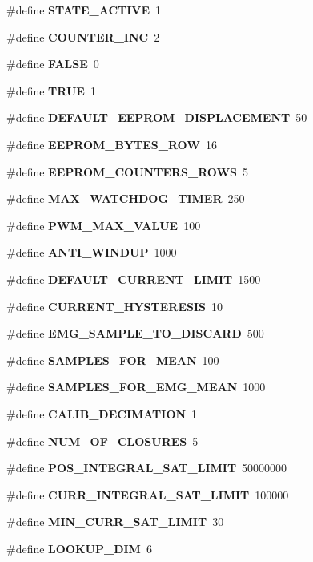 \begin{DoxyCompactItemize}
\item 
\#define \textbf{ S\+T\+A\+T\+E\+\_\+\+A\+C\+T\+I\+VE}~1
\item 
\#define \textbf{ C\+O\+U\+N\+T\+E\+R\+\_\+\+I\+NC}~2
\item 
\mbox{\label{globals_8h_aa93f0eb578d23995850d61f7d61c55c1}} 
\#define {\bfseries F\+A\+L\+SE}~0
\item 
\mbox{\label{globals_8h_aa8cecfc5c5c054d2875c03e77b7be15d}} 
\#define {\bfseries T\+R\+UE}~1
\item 
\#define \textbf{ D\+E\+F\+A\+U\+L\+T\+\_\+\+E\+E\+P\+R\+O\+M\+\_\+\+D\+I\+S\+P\+L\+A\+C\+E\+M\+E\+NT}~50
\item 
\#define \textbf{ E\+E\+P\+R\+O\+M\+\_\+\+B\+Y\+T\+E\+S\+\_\+\+R\+OW}~16
\item 
\#define \textbf{ E\+E\+P\+R\+O\+M\+\_\+\+C\+O\+U\+N\+T\+E\+R\+S\+\_\+\+R\+O\+WS}~5
\item 
\#define \textbf{ M\+A\+X\+\_\+\+W\+A\+T\+C\+H\+D\+O\+G\+\_\+\+T\+I\+M\+ER}~250
\item 
\#define \textbf{ P\+W\+M\+\_\+\+M\+A\+X\+\_\+\+V\+A\+L\+UE}~100
\item 
\#define \textbf{ A\+N\+T\+I\+\_\+\+W\+I\+N\+D\+UP}~1000
\item 
\#define \textbf{ D\+E\+F\+A\+U\+L\+T\+\_\+\+C\+U\+R\+R\+E\+N\+T\+\_\+\+L\+I\+M\+IT}~1500
\item 
\#define \textbf{ C\+U\+R\+R\+E\+N\+T\+\_\+\+H\+Y\+S\+T\+E\+R\+E\+S\+IS}~10
\item 
\#define \textbf{ E\+M\+G\+\_\+\+S\+A\+M\+P\+L\+E\+\_\+\+T\+O\+\_\+\+D\+I\+S\+C\+A\+RD}~500
\item 
\#define \textbf{ S\+A\+M\+P\+L\+E\+S\+\_\+\+F\+O\+R\+\_\+\+M\+E\+AN}~100
\item 
\#define \textbf{ S\+A\+M\+P\+L\+E\+S\+\_\+\+F\+O\+R\+\_\+\+E\+M\+G\+\_\+\+M\+E\+AN}~1000
\item 
\mbox{\label{globals_8h_a373fe6bcff3bcd2f3c47359f9e640bf5}} 
\#define {\bfseries C\+A\+L\+I\+B\+\_\+\+D\+E\+C\+I\+M\+A\+T\+I\+ON}~1
\item 
\mbox{\label{globals_8h_a3132fbe7ff2f1850f96481fca447326a}} 
\#define {\bfseries N\+U\+M\+\_\+\+O\+F\+\_\+\+C\+L\+O\+S\+U\+R\+ES}~5
\item 
\#define \textbf{ P\+O\+S\+\_\+\+I\+N\+T\+E\+G\+R\+A\+L\+\_\+\+S\+A\+T\+\_\+\+L\+I\+M\+IT}~50000000
\item 
\#define \textbf{ C\+U\+R\+R\+\_\+\+I\+N\+T\+E\+G\+R\+A\+L\+\_\+\+S\+A\+T\+\_\+\+L\+I\+M\+IT}~100000
\item 
\mbox{\label{globals_8h_a071576950e29c654790153cad12794cb}} 
\#define {\bfseries M\+I\+N\+\_\+\+C\+U\+R\+R\+\_\+\+S\+A\+T\+\_\+\+L\+I\+M\+IT}~30
\item 
\#define \textbf{ L\+O\+O\+K\+U\+P\+\_\+\+D\+IM}~6
\end{DoxyCompactItemize}
